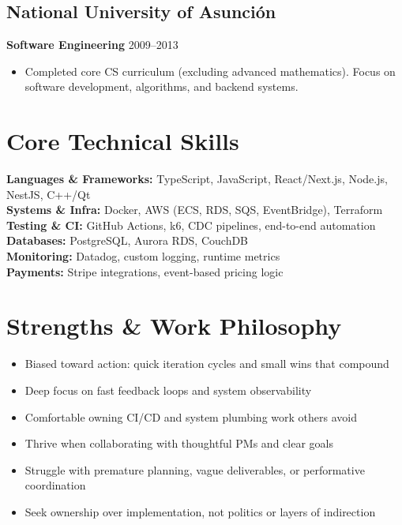 \documentclass[11pt,a4paper]{article}
\newcommand{\cveducation}[4]{
  \subsection{#1}
  \textbf{#2} \hfill \textcolor{mediumgray}{\small #3}
  \begin{itemize}
    \item #4
  \end{itemize}
}
\begin{document}
\cveducation{National University of Asunción}{Software Engineering}{2009--2013}{Completed core CS curriculum (excluding advanced mathematics). Focus on software development, algorithms, and backend systems.}

\section{Core Technical Skills}

\textbf{Languages \& Frameworks:} TypeScript, JavaScript, React/Next.js, Node.js, NestJS, C++/Qt\\[0.4em]
\textbf{Systems \& Infra:} Docker, AWS (ECS, RDS, SQS, EventBridge), Terraform\\[0.4em]
\textbf{Testing \& CI:} GitHub Actions, k6, CDC pipelines, end-to-end automation\\[0.4em]
\textbf{Databases:} PostgreSQL, Aurora RDS, CouchDB\\[0.4em]
\textbf{Monitoring:} Datadog, custom logging, runtime metrics\\[0.4em]
\textbf{Payments:} Stripe integrations, event-based pricing logic

\section{Strengths \& Work Philosophy}

\begin{itemize}
  \item Biased toward action: quick iteration cycles and small wins that compound
  \item Deep focus on fast feedback loops and system observability
  \item Comfortable owning CI/CD and system plumbing work others avoid
  \item Thrive when collaborating with thoughtful PMs and clear goals
  \item Struggle with premature planning, vague deliverables, or performative coordination
  \item Seek ownership over implementation, not politics or layers of indirection
\end{itemize}
\end{document}
